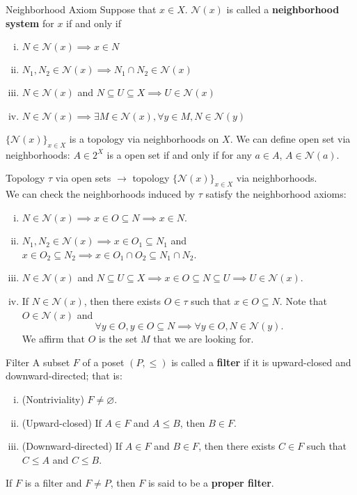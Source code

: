 \documentclass{report}
\begin{document}
\begin{definition}{Neighborhood Axiom}{}
	Suppose that $x\in X$. $\mathcal{N}(x)$ is called a \textbf{neighborhood system} for $x$ if and only if
	\begin{enumerate}[(i)]
		\item $N\in\mathcal{N}(x)\implies x\in N$
		\item $N_1,N_2\in\mathcal{N}(x)\implies N_1\cap N_2\in\mathcal{N}(x)$
		\item $N\in\mathcal{N}(x)$ and $N\subseteq U\subseteq X\implies U\in\mathcal{N}(x)$
		\item $N\in\mathcal{N}(x)\implies \exists M\in\mathcal{N}(x),\forall y\in M,N\in\mathcal{N}(y)\hspace{1pt}$
	\end{enumerate}
	$\{\mathcal{N}(x)\}_{x\in X}$ is a topology via neighborhoods on $X$. We can define open set via neighborhoods: $A\in 2^X$ is a open set if and only if for any $a\in A$, $A\in\mathcal{N}(a)$.
\end{definition}

\begin{prf}
	Topology $\tau$ via open sets $\rightarrow$ topology $\{\mathcal{N}(x)\}_{x\in X}$ via neighborhoods.\\
	We can check the neighborhoods induced by $\tau$ satisfy the neighborhood axioms:
	\begin{enumerate}[(i)]
		\item $N\in\mathcal{N}(x)\implies x\in O\subseteq N \implies x\in N$.
		\item $N_1,N_2\in\mathcal{N}(x)\implies x\in O_1\subseteq N_1 $ and $ x\in O_2\subseteq N_2\implies x\in O_1\cap O_2\subseteq N_1\cap N_2$.
		\item $N\in\mathcal{N}(x)$ and $ N\subseteq U\subseteq X\implies x\in O\subseteq N\subseteq U\implies U\in\mathcal{N}(x)$.
		\item If $N\in\mathcal{N}(x)$, then there exists $O\in\tau$ such that $x\in O\subseteq N$. Note that $O\in \mathcal{N}(x)$ and
		      \[
			      \forall y\in O,y\in O\subseteq N\implies\forall y\in O,N\in\mathcal{N}(y).
		      \]
		      We affirm that $O$ is the set $M$ that we are looking for.
	\end{enumerate}
\end{prf}


\begin{definition}{Filter}{}
	A subset $F$ of a poset $(P,\le)$ is called a \textbf{filter} if it is upward-closed and downward-directed; that is:
	\begin{enumerate}[(i)]
		\item (Nontriviality) $F\ne \varnothing$.
		\item (Upward-closed) If $A \in F$ and $A \le B$, then $B \in F$.
		\item (Downward-directed) If $A \in F$ and $B \in F$, then there exists $C \in F$ such that $C \le A$ and $C \le B$.
	\end{enumerate}
	If $F$ is a filter and $F \ne P$, then $F$ is said to be a \textbf{proper filter}.
\end{definition}
\end{document}
